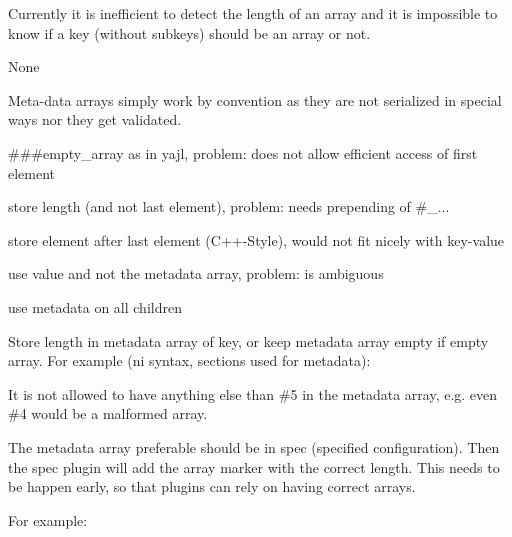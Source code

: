 Currently it is inefficient to detect the length of an array and it is impossible to know if a key (without subkeys) should be an array or not.


\begin{DoxyItemize}
\item None
\end{DoxyItemize}


\begin{DoxyItemize}
\item Meta-\/data arrays simply work by convention as they are not serialized in special ways nor they get validated.
\item {\ttfamily \#\#\#empty\+\_\+array} as in {\ttfamily yajl}, problem\+: does not allow efficient access of first element
\item store length (and not last element), problem\+: needs prepending of {\ttfamily \#\+\_\+...}
\item store element after last element (C++-\/\+Style), would not fit nicely with key-\/value
\item use value and not the metadata {\ttfamily array}, problem\+: is ambiguous
\item use metadata on all children
\end{DoxyItemize}

Store length in metadata {\ttfamily array} of key, or keep metadata {\ttfamily array} empty if empty array. For example ({\ttfamily ni syntax}, sections used for metadata)\+:




It is not allowed to have anything else than {\ttfamily \#5} in the metadata {\ttfamily array}, e.\+g. even {\ttfamily \#4} would be a malformed array.

The metadata {\ttfamily array} preferable should be in {\ttfamily spec} (specified configuration). Then the {\ttfamily spec} plugin will add the {\ttfamily array} marker with the correct length. This needs to be happen early, so that plugins can rely on having correct arrays.

For example\+:




